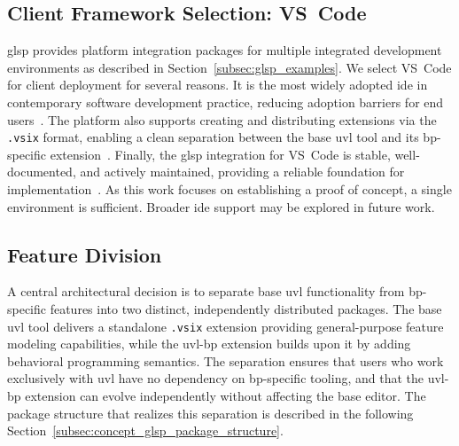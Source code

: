 \subsection{Client Framework Selection: VS~Code}
\label{subsec:concept_glsp_client}

\gls{glsp} provides platform integration packages for multiple integrated development environments as described in Section~\ref{subsec:glsp_examples}.
We select VS~Code for client deployment for several reasons.
It is the most widely adopted \gls{ide} in contemporary software development practice, reducing adoption barriers for end users~\cite{noauthor_technology_nodate}.
The platform also supports creating and distributing extensions via the \texttt{.vsix} format, enabling a clean separation between the base \gls{uvl} tool and its \gls{bp}-specific extension~\cite{schrepfer_what_nodate}.
Finally, the \gls{glsp} integration for VS~Code is stable, well-documented, and actively maintained, providing a reliable foundation for implementation~\cite{noauthor_eclipse-glspglsp-vscode-integration_2026}.
As this work focuses on establishing a proof of concept, a single environment is sufficient.
Broader \gls{ide} support may be explored in future work.

\subsection{Feature Division}
\label{subsec:concept_glsp_feature_division}

A central architectural decision is to separate base \gls{uvl} functionality from \gls{bp}-specific features into two distinct, independently distributed packages.
The base \gls{uvl} tool delivers a standalone \texttt{.vsix} extension providing general-purpose feature modeling capabilities, while the \gls{uvl}-\gls{bp} extension builds upon it by adding behavioral programming semantics.
The separation ensures that users who work exclusively with \gls{uvl} have no dependency on \gls{bp}-specific tooling, and that the \gls{uvl}-\gls{bp} extension can evolve independently without affecting the base editor.
The package structure that realizes this separation is described in the following Section~\ref{subsec:concept_glsp_package_structure}.

